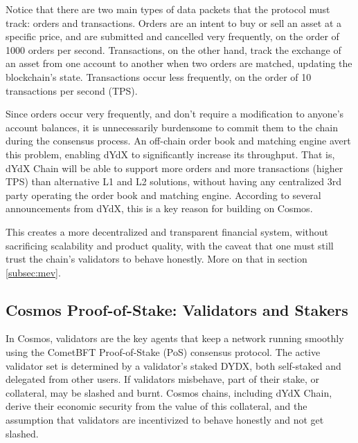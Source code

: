         Notice that there are two main types of data packets that the protocol must track: orders and transactions. Orders are an intent to buy or sell an asset at a specific price, and are submitted and cancelled very frequently, on the order of 1000 orders per second. Transactions, on the other hand, track the exchange of an asset from one account to another when two orders are matched, updating the blockchain's state. Transactions occur less frequently, on the order of 10 transactions per second (TPS). 

        Since orders occur very frequently, and don't require a modification to anyone's account balances, it is unnecessarily burdensome to commit them to the chain during the consensus process. An off-chain order book and matching engine avert this problem, enabling dYdX to significantly increase its throughput. That is, dYdX Chain will be able to support more orders and more transactions (higher TPS) than alternative L1 and L2 solutions, without having any centralized 3rd party operating the order book and matching engine. According to several announcements from dYdX, this is a key reason for building on Cosmos.

        This creates a more decentralized and transparent financial system, without sacrificing scalability and product quality, with the caveat that one must still trust the chain's validators to behave honestly. More on that in section \ref{subsec:mev}.

    \subsection{Cosmos Proof-of-Stake: Validators and Stakers}
    
        In Cosmos, validators are the key agents that keep a network running smoothly using the CometBFT Proof-of-Stake (PoS) consensus protocol. The active validator set is determined by a validator's staked DYDX, both self-staked and delegated from other users. If validators misbehave, part of their stake, or collateral, may be slashed and burnt. Cosmos chains, including dYdX Chain, derive their economic security from the value of this collateral, and the assumption that validators are incentivized to behave honestly and not get slashed.
        
